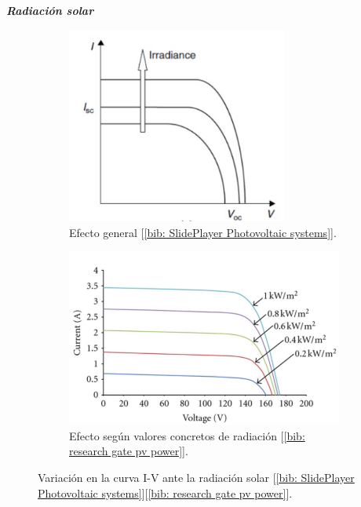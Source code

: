 \documentclass[12pt]{article}
\begin{document}
	\noindent \textit{\textbf{Radiación solar}}
	\begin{figure}[h!]
		\begin{subfigure}{0.45\textwidth}
			\includegraphics[width=0.8\textwidth]{img/generalEffect_irradianceIVcurve_solarCell.png} 
			\caption{Efecto general [\ref{bib: SlidePlayer Photovoltaic systems}].}
			\label{fig: variación general en la curva I-V de una célula PV con la intensidad de la radiación solar.}
		\end{subfigure}
		\begin{subfigure}{0.5\textwidth}
			\includegraphics[width=1.05\linewidth]{img/concreteEffect_irradianceIVcurve_solarCell.png}
			\caption{Efecto según valores concretos de radiación [\ref{bib: research gate pv power}].}
			\label{fig:variación con valores en la curva I-V de una célula PV con la intensidad de la radiación solar.}
		\end{subfigure}
		\caption{Variación en la curva I-V ante la radiación solar [\ref{bib: SlidePlayer Photovoltaic systems}][\ref{bib: research gate pv power}].}
		\label{fig:variación I-V radiación solar}
	\end{figure}
	
\end{document}
